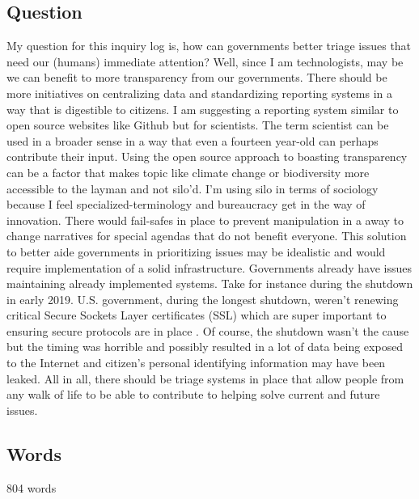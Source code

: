 \documentclass[a4paper,man,biblatex]{apa6}
\begin{document}
\subsection{Question} My question for this inquiry log is, how can governments better triage issues that need our (humans) immediate attention? Well, since I am technologists, may be we can benefit to more transparency from our governments. There should be more initiatives on centralizing data and standardizing reporting systems in a way that is digestible to citizens. I am suggesting a reporting system similar to open source websites like Github but for scientists. The term scientist can be used in a broader sense in a way that even a fourteen year-old can perhaps contribute their input. Using the open source approach to boasting transparency can be a factor that makes topic like climate change or biodiversity more accessible to the layman and not silo'd. I'm using silo in terms of sociology because I feel specialized-terminology and bureaucracy get in the way of innovation. There would fail-safes  in place to prevent manipulation in a away to change narratives for special agendas that do not benefit everyone. This solution to better aide governments in prioritizing issues may be idealistic and would require implementation of a solid infrastructure. Governments already have issues maintaining already implemented systems. Take for instance during the shutdown in early 2019. U.S. government, during the longest shutdown, weren't renewing critical Secure Sockets Layer certificates (SSL) which are super important to ensuring secure protocols are in place \autocite{ssl_govern}. Of course, the shutdown wasn't the cause but the timing was horrible and possibly resulted in a lot of data being exposed to the Internet and citizen's personal identifying information may have been leaked. All in all, there should be triage systems in place that allow people from any walk of life to be able to contribute to helping solve current and future issues.

\subsection{Words} 804 words 

\printbibliography
\end{document}
